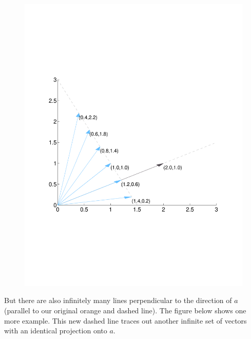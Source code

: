 \documentclass[12pt]{article}
\theoremstyle{plain}
\theoremstyle{definition}
\theoremstyle{remark}
\begin{document}
\begin{figure}[htpb!]
  \centering
  \includegraphics[scale=0.5, trim={2cm, 7cm, 2cm, 7cm}, clip]{Plots/StateSpaceGeometry5.pdf}
\end{figure}

But there are also infinitely many lines perpendicular to the direction
of $a$ (parallel to our original orange and dashed line). The figure
below shows one more example. This new dashed line traces out another
infinite set of vectors with an identical projection onto $a$.
\end{document}
